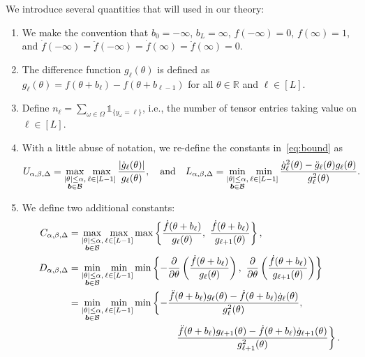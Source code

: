 \documentclass[11pt]{article}
\theoremstyle{plain}
\theoremstyle{definition}
\begin{document}
We introduce several quantities that will used in our theory:
\begin{enumerate}
\item We make the convention that $b_0=-\infty$, $b_L=\infty$, $f(-\infty)=0$, $f(\infty)=1$, and $\dot{f}(-\infty)=\ddot{f}(-\infty)=\dot{f}(\infty)=\ddot{f}(\infty)=0$. 

\item The difference function $g_\ell(\theta)$ is defined as $g_\ell(\theta)=f(\theta+b_\ell)-f(\theta+b_{\ell-1})$ for all $\theta\in\mathbb{R}$ and $\ell\in[L]$. 

\item Define $n_\ell=\sum_{\omega\in\Omega}\mathds{1}_{\{y_\omega=\ell\}}$, i.e., the number of tensor entries taking value on $\ell\in[L]$.

\item With a little abuse of notation, we re-define the constants in~\eqref{eq:bound} as
\begin{equation}\label{eq:UL}
U_{\alpha,\beta,\Delta}=\max_{ \substack{|\theta|\leq \alpha,\\ \bm{b} \in\mathcal{B}}}\max_{\ell\in[L-1]}{|\dot{g}_\ell(\theta)|\over g_\ell(\theta)}, \quad \text{and}\quad
L_{\alpha,\beta,\Delta}=\min_{ \substack{|\theta|\leq \alpha,\\ \bm{b} \in\mathcal{B}}}\min_{\ell\in[L-1]} {\dot{g}^2_\ell(\theta)-\ddot{g}_\ell(\theta)g_\ell(\theta)\over g^2_\ell(\theta)}.
\end{equation}
\item We define two additional constants:
\begin{align}\label{eq:CD}
C_{\alpha,\beta,\Delta} &= \max_{ \substack{|\theta|\leq \alpha,\\ \mb \in\tB}}  \max_{\ell\in[L-1]}\max\left\{\frac{\dot{f}(\theta+b_\ell)}{g_\ell(\theta)},\ \frac{\dot{f}(\theta+b_\ell)}{g_{\ell+1}(\theta)}\right\},\notag \\
D_{\alpha,\beta,\Delta} &=\min_{ \substack{|\theta|\leq \alpha,\\ \mb \in\tB}} \min_{\ell\in[L-1]}\min\left\{ - {\partial \over \partial \theta}\left({\dot{f}(\theta+b_{\ell})\over g_\ell(\theta)}\right),\ {\partial \over \partial \theta}\left({\dot{f}(\theta+b_{\ell})\over g_{\ell+1}(\theta)}\right)\right\}\notag \\
&=  \min_{ \substack{|\theta|\leq \alpha,\\ \mb \in\tB}}\min_{\ell\in[L-1]}\min \left\{-\frac{\ddot{f}(\theta+b_\ell)g_\ell(\theta)-\dot{f}(\theta+b_\ell)\dot{g}_\ell(\theta)}{g^2_\ell(\theta)},\ \right. \notag \\
&\hspace{1.5in} \left. \frac{\ddot{f}(\theta+b_\ell)g_{\ell+1}(\theta)-\dot{f}(\theta+b_\ell)\dot{g}_{\ell+1}(\theta)}{g^2_{\ell+1}(\theta)}\right\}.
\end{align} 
\end{enumerate}
\end{document}
